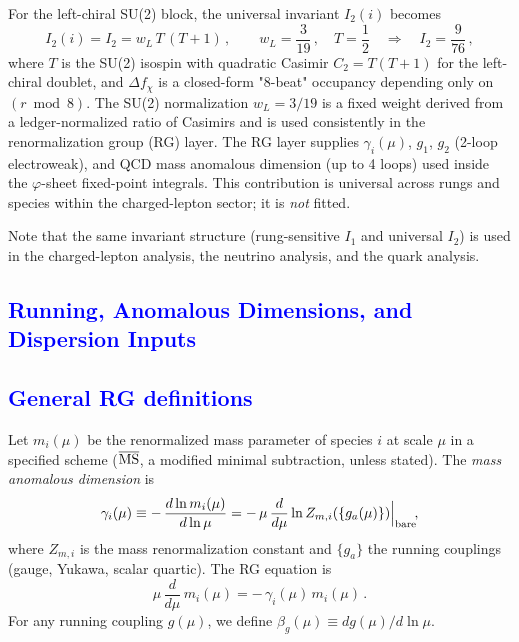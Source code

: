 \documentclass[%
amsmath,amssymb,
aps,
prb,
floatfix,showkeys
]{revtex4-2}
\newcommand{\modif}[1]{\textcolor{blue}{#1}}
\begin{document}
For the left-chiral SU(2) block, the universal invariant $I_2(i)$ becomes
\begin{equation}
  I_2(i) = I_2 = w_L\,T\,(T+1)\,, \qquad w_L=\frac{3}{19}\,,\quad
  T=\frac{1}{2}\quad\Rightarrow\quad I_2=\frac{9}{76}\,,
\label{eq:I2_def}
\end{equation}
where $T$ is the SU(2) isospin with quadratic Casimir $C_2 = T(T+1)$ for the left-chiral doublet, and $\Delta f_\chi$ is a closed-form "8-beat" occupancy depending only on $(r\bmod 8)$. The SU(2) normalization $w_L=3/19$ is a fixed weight derived from a ledger-normalized ratio of Casimirs and is used consistently in the renormalization group (RG) layer. The RG layer supplies $\gamma_i(\mu)$, $g_1$, $g_2$ (2-loop electroweak), and QCD mass anomalous dimension (up to 4 loops) used inside the $\varphi$-sheet fixed-point integrals. This contribution is universal across rungs and species within the charged-lepton sector; it is \emph{not} fitted.

Note that the same invariant structure (rung-sensitive $I_1$ and universal $I_2$) is used in the charged-lepton analysis, the neutrino analysis, and the quark analysis.

{\modif{\section{Running, Anomalous Dimensions, and Dispersion Inputs}
\label{sec:running}}}

{\modif{\subsection{General RG definitions}    
\label{subsec:rg_defs}}}

Let $m_i(\mu)$ be the renormalized mass parameter of species $i$ at scale $\mu$ in a specified scheme ($\overline{\rm MS}$, a modified minimal subtraction, unless stated). The \emph{mass anomalous dimension} is
\begin{equation}
  \gamma_i(\mu) \equiv -\,\frac{d\ln m_i(\mu)}{d\ln\mu}
  = -\,\mu\,\frac{d}{d\mu}\ln Z_{m,i}(\{g_a(\mu)\})\Big|_{\rm bare}\!,
  \label{eq:gamma_def}
\end{equation}
where $Z_{m,i}$ is the mass renormalization constant and $\{g_a\}$ the running couplings (gauge, Yukawa, scalar quartic). The RG equation is
\begin{equation}
  \mu\,\frac{d}{d\mu}\,m_i(\mu) = -\,\gamma_i(\mu)\,m_i(\mu)\,.
  \label{eq:RGE_mass}
\end{equation}
For any running coupling $g(\mu)$, we define $\beta_g(\mu)\equiv d g(\mu)/d\ln\mu$.
\end{document}
